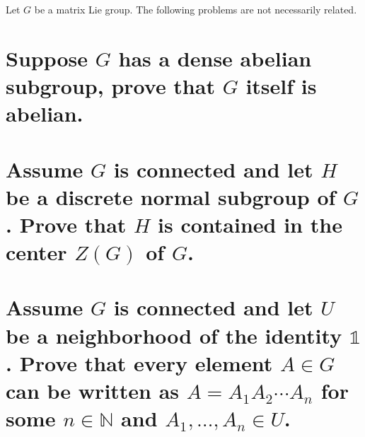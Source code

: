 \documentclass[pages,boxes,color=WildStrawberry]{homework}
\newcommand{\N}{\mathbb{N}}
\newcommand{\1}{\mathbb{1}}
\begin{document}
\begin{problem}
Let $G$ be a matrix Lie group. The following problems are not necessarily related.
\begin{parts}
	\part{Suppose $G$ has a dense abelian subgroup, prove that $G$ itself is abelian.}\label{part:3a}
	\part{Assume $G$ is connected and let $H$ be a discrete normal subgroup of $G$. Prove that $H$ is contained in the center $Z(G)$ of $G$.}\label{part:3b}
	\part{Assume $G$ is connected and let $U$ be a neighborhood of the identity $\mathbb{1}$. Prove that every element $A\in G$ can be written as $A = A_1A_2\cdots A_n$ for some $n\in\N$ and $A_1,\ldots,A_n\in U$.}\label{part:3c}
\end{parts}
\end{problem}
\end{document}
